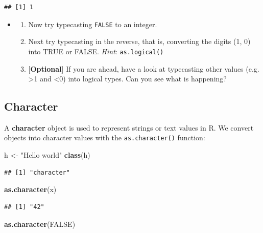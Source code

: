 \documentclass[a4paper]{book}
\newenvironment{Shaded}{\begin{snugshade}}{\end{snugshade}}
\newcommand{\KeywordTok}[1]{\textcolor[rgb]{0.13,0.29,0.53}{\textbf{{#1}}}}
\newcommand{\StringTok}[1]{\textcolor[rgb]{0.31,0.60,0.02}{{#1}}}
\newcommand{\OtherTok}[1]{\textcolor[rgb]{0.56,0.35,0.01}{{#1}}}
\newcommand{\NormalTok}[1]{{#1}}
\renewenvironment{Shaded}
{\vspace{1.5em}\begin{leftbar}\begin{snugshade}}
{\end{snugshade}\end{leftbar}\vspace{3pt}}
\newenvironment{rmdblock}[1]
  {\vspace{1.5em}\begin{shaded*}
  \begin{itemize}
  \renewcommand{\labelitemi}{
    \raisebox{-.7\height}[0pt][0pt]{
      {\setkeys{Gin}{width=3em,keepaspectratio}\texttt{[image: images/\#1]}}
    }
  }
  \item
  }
  {
  \end{itemize}
  \end{shaded*}
  }
\newenvironment{rmdexercise}
  {\begin{rmdblock}{exercise}}
  {\end{rmdblock}}
\begin{document}
\begin{verbatim}
## [1] 1
\end{verbatim}

\begin{rmdexercise}
\begin{enumerate}
\def\labelenumi{\arabic{enumi}.}
\item
  Now try typecasting \texttt{FALSE} to an integer.
\item
  Next try typecasting in the reverse, that is, converting the digits
  (1, 0) into TRUE or FALSE. \emph{Hint}: \texttt{as.logical()}
\item
  {[}\textbf{Optional}{]} If you are ahead, have a look at typecasting
  other values (e.g. \textgreater{}1 and \textless{}0) into logical
  types. Can you see what is happening?
\end{enumerate}
\end{rmdexercise}

\subsection{Character}\label{character}

A \textbf{character} object is used to represent strings or text values
in R. We convert objects into character values with the
\texttt{as.character()} function:

\begin{Shaded}
\begin{Highlighting}[]
\NormalTok{h <-}\StringTok{ "Hello world"}
\KeywordTok{class}\NormalTok{(h)}
\end{Highlighting}
\end{Shaded}

\begin{verbatim}
## [1] "character"
\end{verbatim}

\begin{Shaded}
\begin{Highlighting}[]
\KeywordTok{as.character}\NormalTok{(x)}
\end{Highlighting}
\end{Shaded}

\begin{verbatim}
## [1] "42"
\end{verbatim}

\begin{Shaded}
\begin{Highlighting}[]
\KeywordTok{as.character}\NormalTok{(}\OtherTok{FALSE}\NormalTok{)}
\end{Highlighting}
\end{Shaded}
\end{document}
